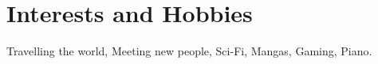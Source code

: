 \documentclass[11pt,a4paper,roman]{moderncv}        %
\begin{document}
\section{Interests and Hobbies}
\vspace{-5px}
Travelling the world, Meeting new people, Sci-Fi, Mangas, Gaming, Piano.
%
\end{document}
